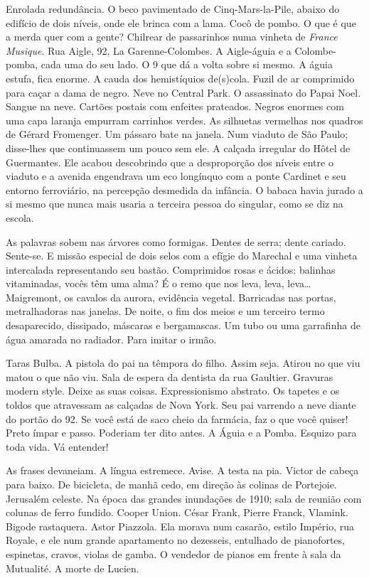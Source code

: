 Enrolada redundância. O beco pavimentado de Cinq-Mars-la-Pile, abaixo do
edifício de dois níveis, onde ele brinca com a lama. Cocô de pombo. O
que é que a merda quer com a gente? Chilrear de passarinhos numa vinheta
de \emph{France Musique}. Rua Aigle, 92, La Garenne-Colombes. A
Aigle-águia e a Colombe-pomba, cada uma do seu lado. O 9 que dá a volta
sobre si mesmo. A águia estufa, fica enorme. A cauda dos hemistíquios
de(s)cola. Fuzil de ar comprimido para caçar a dama de negro. Neve no
Central Park. O assassinato do Papai Noel. Sangue na neve. Cartões
postais com enfeites prateados. Negros enormes com uma capa laranja
empurram carrinhos verdes. As silhuetas vermelhas nos quadros de Gérard
Fromenger. Um pássaro bate na janela. Num viaduto de São Paulo;
disse-lhes que continuassem um pouco sem ele. A calçada irregular do
Hôtel de Guermantes. Ele acabou descobrindo que a desproporção dos
níveis entre o viaduto e a avenida engendrava um eco longínquo com a
ponte Cardinet e seu entorno ferroviário, na percepção desmedida da
infância. O babaca havia jurado a si mesmo que nunca mais usaria a
terceira pessoa do singular, como se diz na escola.

As palavras sobem nas árvores como formigas. Dentes de serra; dente
cariado. Sente-se. E missão especial de dois selos com a efígie do
Marechal e uma vinheta intercalada representando seu bastão. Comprimidos
rosas e ácidos: balinhas vitaminadas, vocês têm uma alma? É o remo que
nos leva, leva, leva\ldots{} Maigremont, os cavalos da aurora, evidência
vegetal. Barricadas nas portas, metralhadoras nas janelas. De noite, o
fim dos meios e um terceiro termo desaparecido, dissipado, máscaras e
bergamascas. Um tubo ou uma garrafinha de água amarada no radiador. Para
imitar o irmão.

Taras Bulba. A pistola do pai na têmpora do filho. Assim seja. Atirou no
que viu matou o que não viu. Sala de espera da dentista da rua Gaultier.
Gravuras modern style. Deixe as suas coisas. Expressionismo abstrato. Os
tapetes e os toldos que atravessam as calçadas de Nova York. Seu pai
varrendo a neve diante do portão do 92. Se você está de saco cheio da
farmácia, faz o que você quiser! Preto ímpar e passo. Poderiam ter dito
antes. A Águia e a Pomba. Esquizo para toda vida. Vá entender!

As frases devaneiam. A língua estremece. Avise. A testa na pia. Victor
de cabeça para baixo. De bicicleta, de manhã cedo, em direção às colinas
de Portejoie. Jerusalém celeste. Na época das grandes inundações de
1910; sala de reunião com colunas de ferro fundido. Cooper Union. César
Frank, Pierre Franck, Vlamink. Bigode rastaquera. Astor Piazzola. Ela
morava num casarão, estilo Império, rua Royale, e ele num grande
apartamento no dezesseis, entulhado de pianofortes, espinetas,
cravos, violas de gamba. O vendedor de pianos em frente à sala da
Mutualité. A morte de Lucien.

